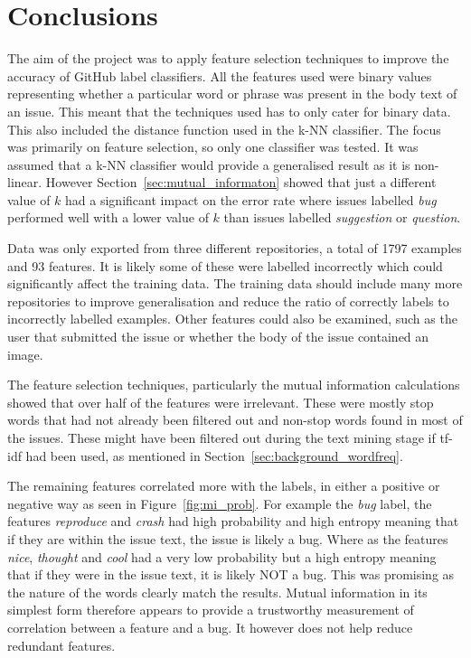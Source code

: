 \section{Conclusions}
The aim of the project was to apply feature selection techniques to improve the accuracy of GitHub label classifiers. All the
features used were binary values representing whether a particular word or phrase was present in the body text of an issue. This
meant that the techniques used has to only cater for binary data. This also included the distance function used in the k-NN
classifier. The focus was primarily on feature selection, so only one classifier was tested. It was assumed that a k-NN
classifier would provide a generalised result as it is non-linear. However Section~\ref{sec:mutual_informaton} showed that just
a different value of $k$ had a significant impact on the error rate where issues labelled \textit{bug} performed well with a
lower value of $k$ than issues labelled \textit{suggestion} or \textit{question}.

Data was only exported from three different repositories, a total of 1797 examples and 93 features. It is likely some of these
were labelled incorrectly which could significantly affect the training data. The training data should include many more
repositories to improve generalisation and reduce the ratio of correctly labels to incorrectly labelled examples. Other features
could also be examined, such as the user that submitted the issue or whether the body of the issue contained an image.

The feature selection techniques, particularly the mutual information calculations showed that over half of the features were
irrelevant. These were mostly stop words that had not already been filtered out and non-stop words found in most of the issues.
These might have been filtered out during the text mining stage if tf-idf had been used, as mentioned in
Section~\ref{sec:background_wordfreq}.

The remaining features correlated more with the labels, in either a positive or negative way as seen in
Figure~\ref{fig:mi_prob}. For example the \textit{bug} label, the features \textit{reproduce} and \textit{crash} had high
probability and high entropy meaning that if they are within the issue text, the issue is likely a bug. Where as the features
\textit{nice}, \textit{thought} and \textit{cool} had a very low probability but a high entropy meaning that if they were in the
issue text, it is likely NOT a bug. This was promising as the nature of the words clearly match the results. Mutual information
in its simplest form therefore appears to provide a trustworthy measurement of correlation between a feature and a bug. It
however does not help reduce redundant features.

